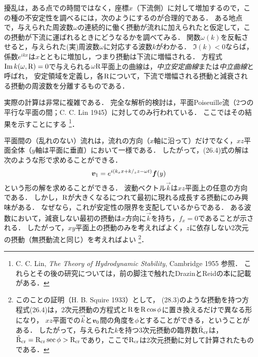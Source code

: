 擾乱は，ある点での時間ではなく，座標$x$（下流側）に対して増加するので，この種の不安定性を調べるには，次のようにするのが合理的である．
ある地点で，与えられた周波数$\omega$の連続的に働く摂動が流れに加えられたと仮定して，この摂動が下流に運ばれるときにどうなるかを調べてみる．
関数$\omega(k)$を反転させると，与えられた(実)周波数$\omega$に対応する波数$k$がわかる．
$\Im(k)<0$ならば，係数$e^{ikx}$は$x$とともに増加し，つまり摂動は下流に増幅される．
方程式$\Im k(\omega,\mathrm{R})=0$で与えられる$\omega\mathrm{R}$平面上の曲線は，\emph{中立安定曲線}または\emph{中立曲線}と呼ばれ，
安定領域を定義し，各$\mathrm{R}$について，下流で増幅される摂動と減衰される摂動の周波数を分離するものである．



実際の計算は非常に複雑である．
完全な解析的検討は，平面Poiseuille流（2つの平行な平面の間；C. C. Lin 1945）に対してのみ行われている．
ここではその結果を示すことにする
\footnote{C. C. Lin, \textit{The Theory of Hydrodynamic Stability}, Cambridge 1955 参照．
これらとその後の研究については，前の脚注で触れたDrazinとReidの本に記載がある．}．




平面間の（乱れのない）流れは，流れの方向（$x$軸に沿って）だけでなく，$xz$平面全体（$y$軸は平面に垂直）において一様である．
したがって，(26.4)式の解は次のような形で求めることができる．
\begin{equation}
    \vb*{v}_1 = e^{i(k_xx+k/_zz-\omega t)} \vb*{f}(y)
\end{equation}
という形の解を求めることができる．
波動ベクトル$\vec{k}$は$xz$平面上の任意の方向である．
しかし，$\mathrm{R}$が大きくなるにつれて最初に現れる成長する摂動にのみ興味がある．
なぜなら，これが安定性の限界を支配しているからである．
ある波数において，減衰しない最初の摂動は$x$方向に$\vec{k}$を持ち，$f_x=0$であることが示される．
したがって，$xy$平面上の摂動のみを考えればよく，$z$に依存しない2次元の摂動（無摂動流と同じ）を考えればよい
\footnote{
このことの証明（H. B. Squire 1933）として，
(28.3)のような摂動を持つ方程式(26.4)は，2次元摂動の方程式と$\mathrm{R}$を$\mathrm{R}\cos\phi$に置き換えるだけで異なる形になり，
$xz$平面での$\vec{k}$と$\vb*{v}_0$間の角度を$\phi$とすることができる，ということがある．
したがって，与えられた$k$を持つ3次元摂動の臨界数$\tilde{\mathrm{R}}_{\mathrm{cr}}$は，
$\tilde{\mathrm{R}}_{\mathrm{cr}} = \mathrm{R}_{\mathrm{cr}} \sec\phi > \mathrm{R}_{\mathrm{cr}}$であり，ここで$\mathrm{R}_{\mathrm{cr}}$は2次元摂動に対して計算されたものである．}．




